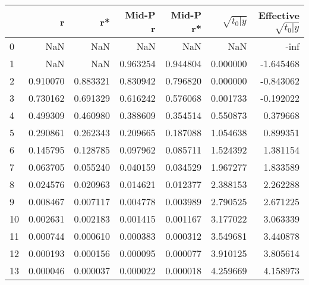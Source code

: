 \begin{tabular}{lrrrrrr}
\toprule
 & r & r* & Mid-P r & Mid-P r* & $\sqrt{t_0\vert y}$ & Effective $\sqrt{t_0\vert y}$ \\
\midrule
0 & NaN & NaN & NaN & NaN & NaN & -inf \\
1 & NaN & NaN & 0.963254 & 0.944804 & 0.000000 & -1.645468 \\
2 & 0.910070 & 0.883321 & 0.830942 & 0.796820 & 0.000000 & -0.843062 \\
3 & 0.730162 & 0.691329 & 0.616242 & 0.576068 & 0.001733 & -0.192022 \\
4 & 0.499309 & 0.460980 & 0.388609 & 0.354514 & 0.550873 & 0.379668 \\
5 & 0.290861 & 0.262343 & 0.209665 & 0.187088 & 1.054638 & 0.899351 \\
6 & 0.145795 & 0.128785 & 0.097962 & 0.085711 & 1.524392 & 1.381154 \\
7 & 0.063705 & 0.055240 & 0.040159 & 0.034529 & 1.967277 & 1.833589 \\
8 & 0.024576 & 0.020963 & 0.014621 & 0.012377 & 2.388153 & 2.262288 \\
9 & 0.008467 & 0.007117 & 0.004778 & 0.003989 & 2.790525 & 2.671225 \\
10 & 0.002631 & 0.002183 & 0.001415 & 0.001167 & 3.177022 & 3.063339 \\
11 & 0.000744 & 0.000610 & 0.000383 & 0.000312 & 3.549681 & 3.440878 \\
12 & 0.000193 & 0.000156 & 0.000095 & 0.000077 & 3.910125 & 3.805614 \\
13 & 0.000046 & 0.000037 & 0.000022 & 0.000018 & 4.259669 & 4.158973 \\
\bottomrule
\end{tabular}
